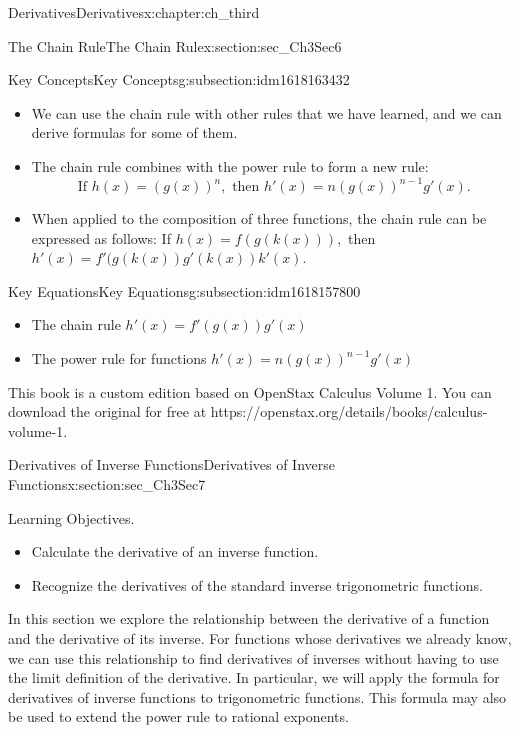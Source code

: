 \documentclass[oneside,10pt,]{book}
\numberwithin{equation}{section}
\begin{document}
\begin{chapterptx}{Derivatives}{}{Derivatives}{}{}{x:chapter:ch_third}
\begin{sectionptx}{The Chain Rule}{}{The Chain Rule}{}{}{x:section:sec_Ch3Sec6}
\begin{subsectionptx}{Key Concepts}{}{Key Concepts}{}{}{g:subsection:idm1618163432}
\begin{itemize}[label=\textbullet]
%
\item{}We can use the chain rule with other rules that we have learned, and we can derive formulas for some of them.%
\item{}The chain rule combines with the power rule to form a new rule:%
\begin{equation*}
\text{ If } h(x)=(g(x))^n ,\text{ then } h'(x)=n(g(x))^{n-1}g'(x).
\end{equation*}
%
\item{}When applied to the composition of three functions, the chain rule can be expressed as follows: If \(h(x)=f(g(k(x))),\) then \(h'(x)=f'(g(k(x))g'(k(x))k'(x).\)%
\end{itemize}
\end{subsectionptx}
%
%
\typeout{************************************************}
\typeout{************************************************}
%
\begin{subsectionptx}{Key Equations}{}{Key Equations}{}{}{g:subsection:idm1618157800}
%
\begin{itemize}[label=\textbullet]
\item{}The chain rule \(h'(x)=f'(g(x))g'(x)\)%
\item{}The power rule for functions \(h'(x)=n(g(x))^{n-1}g'(x)\)%
\end{itemize}
\end{subsectionptx}
This book is a custom edition based on OpenStax Calculus Volume 1. You can download the original for free at https:\slash{}\slash{}openstax.org\slash{}details\slash{}books\slash{}calculus-volume-1.%
\end{sectionptx}
%
%
\typeout{************************************************}
\typeout{************************************************}
%
\begin{sectionptx}{Derivatives of Inverse Functions}{}{Derivatives of Inverse Functions}{}{}{x:section:sec_Ch3Sec7}
\begin{introduction}{Learning Objectives.}%
%
\begin{itemize}[label=\textbullet]
\item{}Calculate the derivative of an inverse function.%
\item{}Recognize the derivatives of the standard inverse trigonometric functions.%
\end{itemize}
In this section we explore the relationship between the derivative of a function and the derivative of its inverse. For functions whose derivatives we already know, we can use this relationship to find derivatives of inverses without having to use the limit definition of the derivative. In particular, we will apply the formula for derivatives of inverse functions to trigonometric functions. This formula may also be used to extend the power rule to rational exponents.%

\end{introduction}
\end{sectionptx}
\end{chapterptx}
\end{document}
